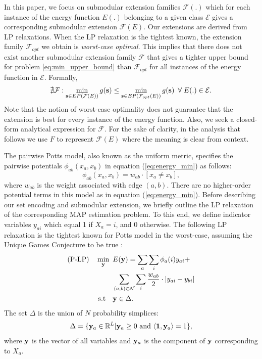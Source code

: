 
In this paper, we focus on submodular extension families $\mathcal F(.)$ which
for each instance of the energy function $E(.)$ belonging to a given class $\mathcal E$ gives a corresponding
submodular extension ${\mathcal F}(E)$. Our extensions are derived from LP relaxations. When the LP relaxation is the tightest known, the extension family ${\mathcal
F}_{opt}$ we obtain is \emph{worst-case optimal}. This implies that there does not
exist another submodular extension family ${\mathcal F}$ that gives a tighter
upper bound for problem \eqref{eq:min_upper_bound} than ${\mathcal F}_{opt}$
for all instances of the energy function in $\mathcal E$. Formally, 
\begin{equation}
    \nexists {\mathcal F}: \min_{{\bf s} \in EP({\mathcal F}(E))} g({\bf s})
    \leq \min_{{\bf s} \in EP({\mathcal F}_{opt}(E))} g({\bf s}) \enspace
    \forall \; E(.) \in \mathcal E.
    \label{eq:best_submod}
\end{equation}
Note that the notion of worst-case optimality does not guarantee that the extension is best for every instance of the energy function. 
Also, we seek a closed-form analytical expression for $\mathcal F$. For the sake of clarity,
in the analysis that follows we use $F$ to represent ${\mathcal F}(E)$ where
the meaning is clear from context.

The pairwise Potts model, also known as the uniform metric, specifies the pairwise potentials $\phi_{ab}(x_a, x_b)$ in equation (\ref{eq:energy_min}) as follows:
\begin{equation}
    \phi_{ab}(x_a, x_b) = w_{ab} \cdot [x_a \neq x_b],
\end{equation}
where $w_{ab}$ is the weight associated with edge $(a, b)$. There are no higher-order potential terms in this model as in equation (\ref{eq:energy_min}).
%
 Before describing our set encoding and submodular extension, we briefly outline the LP relaxation of the corresponding MAP estimation problem. To this end, we define indicator variables $y_{ai}$ which equal 1 if $X_a = i$, and 0 otherwise. The following LP relaxation is the tightest known for Potts model in the worst-case, assuming the Unique Games Conjecture to be true \citep{manokaran2008sdp}:
\begin{align}
    \text{(P-LP)} \quad \min_{\bf y} \enskip & E({\bf y}) =  \sum_{a} \sum_{i} \phi_a(i)y_{ai} + \nonumber\\
     &\sum_{(a, b) \in {\mathcal N}} \sum_{i} \frac{w_{ab}}{2} \cdot |y_{ai} - y_{bi}| \nonumber\\
    \text{s.t} \quad &{\bf y} \in \Delta.
\label{eq:p-lp}
\end{align}
The set $\Delta$ is the union of $N$ probability simplices:
\begin{equation}
    \Delta = \{{\bf y}_a \in \mathbb{R}^L | {\bf y}_a \geq 0  \textrm{ and } \langle {\bf 1}, {\bf y}_a \rangle = 1\},
    \label{eq:delta}
\end{equation}
where $\bf y$ is the vector of all variables and ${\bf y}_a$ is the component
of $\bf y$ corresponding to $X_a$.


